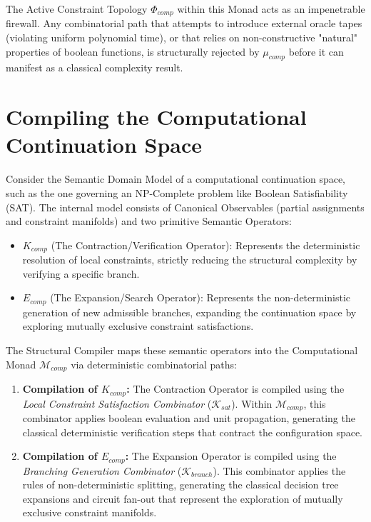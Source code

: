 \documentclass[12pt,openany]{extbook}
\theoremstyle{plain}
\theoremstyle{definition}
\begin{document}
The Active Constraint Topology $\Phi_{comp}$ within this Monad acts as an impenetrable firewall. Any combinatorial path that attempts to introduce external oracle tapes (violating uniform polynomial time), or that relies on non-constructive "natural" properties of boolean functions, is structurally rejected by $\mu_{comp}$ before it can manifest as a classical complexity result.

\section{Compiling the Computational Continuation Space}

Consider the Semantic Domain Model of a computational continuation space, such as the one governing an NP-Complete problem like Boolean Satisfiability (SAT). The internal model consists of Canonical Observables (partial assignments and constraint manifolds) and two primitive Semantic Operators:
\begin{itemize}
    \item $K_{comp}$ (The Contraction/Verification Operator): Represents the deterministic resolution of local constraints, strictly reducing the structural complexity by verifying a specific branch.
    \item $E_{comp}$ (The Expansion/Search Operator): Represents the non-deterministic generation of new admissible branches, expanding the continuation space by exploring mutually exclusive constraint satisfactions.
\end{itemize}

The Structural Compiler maps these semantic operators into the Computational Monad $\mathcal{M}_{comp}$ via deterministic combinatorial paths:

\begin{enumerate}
    \item \textbf{Compilation of $K_{comp}$:} The Contraction Operator is compiled using the \emph{Local Constraint Satisfaction Combinator} ($\mathcal{K}_{sat}$). Within $\mathcal{M}_{comp}$, this combinator applies boolean evaluation and unit propagation, generating the classical deterministic verification steps that contract the configuration space.
    \item \textbf{Compilation of $E_{comp}$:} The Expansion Operator is compiled using the \emph{Branching Generation Combinator} ($\mathcal{K}_{branch}$). This combinator applies the rules of non-deterministic splitting, generating the classical decision tree expansions and circuit fan-out that represent the exploration of mutually exclusive constraint manifolds.
\end{enumerate}
\end{document}
